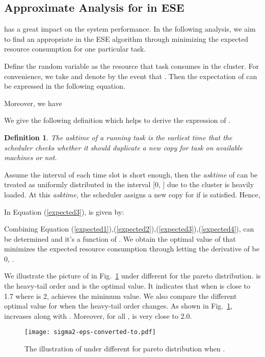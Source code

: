 \documentclass[10pt,conference]{IEEEtran}
\newtheorem{definition}{Definition}
\begin{document}
\subsection{Approximate Analysis for  in ESE}
 has a great impact on the system performance. In the following analysis,  we aim to find an appropriate   in the ESE algorithm through minimizing the expected resource consumption for one particular task.

Define the random variable  as the resource that task  consumes in the cluster. For convenience, we take  and  denote by  the event that . Then the expectation of   can be expressed in the following equation.

Moreover, we have


We give the following definition which helps to derive the expression of .
\begin{definition}
The \textit{asktime} of a running task  is the earliest time that the scheduler checks whether it should duplicate a new copy for task  on available machines or not.
\end{definition}

Assume the interval of each time slot is short enough, then the \textit{asktime} of  can be treated as uniformly distributed in the interval [0, ] due to the cluster is heavily loaded. At this \textit{asktime}, the scheduler assigns a new copy for  if  is satisfied. Hence,

In Equation (\ref{expected3}),  is given by:

Combining Equation (\ref{expected1}),(\ref{expected2}),(\ref{expected3}),(\ref{expected4}),  can be determined and it's a function of . We obtain the optimal value of  that minimizes the expected resource consumption through letting the derivative of  be 0, .

We illustrate the picture of   in Fig.~\ref{sigma2} under different  for the pareto distribution.   is the heavy-tail order and  is the optimal value. It indicates that when  is close to 1.7 where  is 2,  achieves the minimum value. We also compare the different optimal value for  when the heavy-tail order changes. As shown in Fig.~\ref{sigma2},   increases along with . Moreover, for all ,  is very close to 2.0.

\begin{figure}
\centering
\texttt{[image: sigma2-eps-converted-to.pdf]}
\caption{The illustration of  under different  for pareto distribution when  .}
\label{sigma2}
\vspace{-0.3 cm}
\end{figure}
\end{document}
